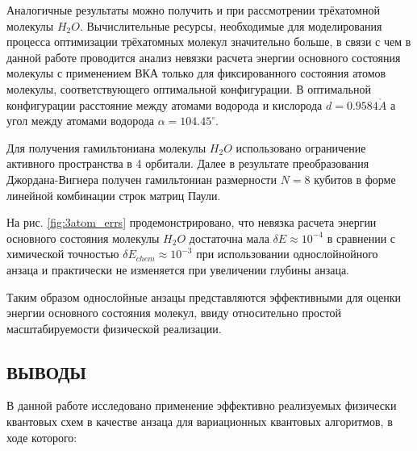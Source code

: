 \documentclass[14pt]{extarticle}
\begin{document}
\qquad Аналогичные результаты можно получить и при рассмотрении трёхатомной молекулы $H_2O$. Вычислительные ресурсы, необходимые для моделирования процесса оптимизации трёхатомных молекул значительно больше, в связи с чем в данной работе проводится анализ невязки расчета энергии основного состояния молекулы с применением ВКА только для фиксированного состояния атомов молекулы, соответствующего оптимальной конфигурации. В оптимальной конфигурации расстояние между атомами водорода и кислорода $d = 0.9584 \mathring A$ а угол между атомами водорода $\alpha = 104.45^{\circ}$.

\qquad Для получения гамильтониана молекулы $H_2O$ использовано ограничение активного пространства в 4 орбитали. Далее в результате преобразования Джордана-Вигнера получен гамильтониан размерности $N = 8$ кубитов в форме линейной комбинации строк матриц Паули.

\qquad На рис. \ref{fig:3atom_errs} продемонстрировано, что невязка расчета энергии основного состояния молекулы $H_2O$ достаточна мала $\delta E \approx 10^{-4}$ в сравнении с химической точностью $\delta E_{chem} \approx 10^{-3}$ при использовании однослойнойного анзаца и практически не изменяется при увеличении глубины анзаца.

\qquad Таким образом однослойные анзацы представляются эффективными для оценки энергии основного состояния молекул, ввиду относительно простой масштабируемости физической реализации. 

\newpage

\begin{center}
\section*{ВЫВОДЫ}
\end{center}


\qquad В данной работе исследовано применение эффективно реализуемых физически квантовых схем в качестве анзаца для вариационных квантовых алгоритмов, в ходе которого:
\end{document}
